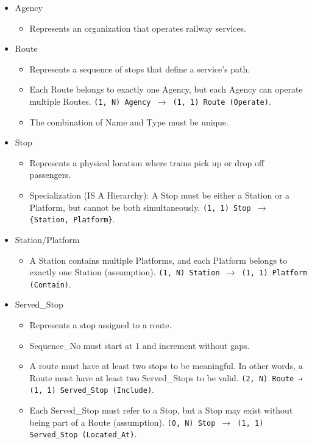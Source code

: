 \documentclass[a4paper, 12pt]{article}
\begin{document}
\begin{itemize}
    \item Agency
    \begin{itemize}
        \item Represents an organization that operates railway services.
    \end{itemize}

    \item Route
    \begin{itemize}
        \item Represents a sequence of stops that define a service's path.
        \item Each Route belongs to exactly one Agency, but each Agency can operate multiple Routes. \texttt{(1, N) Agency $\to$ (1, 1) Route (Operate)}.
        \item The combination of Name and Type must be unique.
    \end{itemize}

    \item Stop
    \begin{itemize}
        \item Represents a physical location where trains pick up or drop off passengers.
        \item Specialization (IS A Hierarchy): A Stop must be either a Station or a Platform, but cannot be both simultaneously. \texttt{(1, 1) Stop $\to$ \{Station, Platform\}}.
    \end{itemize}


    \item Station/Platform
    \begin{itemize}
        \item A Station contains multiple Platforms, and each Platform belongs to exactly one Station (assumption). \texttt{(1, N) Station $\to$ (1, 1) Platform (Contain)}.
    \end{itemize}

    \item Served\_Stop
    \begin{itemize}
        \item Represents a stop assigned to a route.
        \item Sequence\_No must start at 1 and increment without gaps.
        \item A route must have at least two stops to be meaningful. In other words, a Route must have at least two Served\_Stops to be valid. \texttt{(2, N) Route → (1, 1) Served\_Stop (Include)}.
        \item Each Served\_Stop must refer to a Stop, but a Stop may exist without being part of a Route (assumption). \texttt{(0, N) Stop $\to$ (1, 1) Served\_Stop (Located\_At)}.
    \end{itemize}


\end{itemize}
\end{document}
